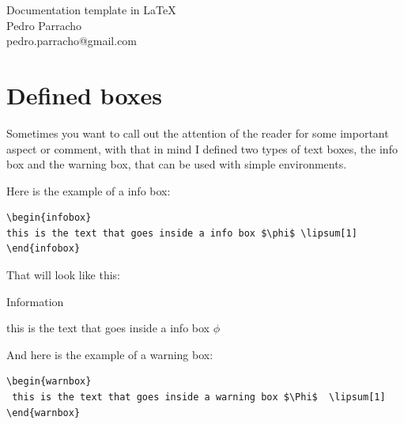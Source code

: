 \documentclass[12pt, a4paper,twoside]{article}
\title{\titleinfo}
\author{\authorinfo \\ \authoremail }
\date{}                                           %
\makeatletter
\def\mymaketitle{
\thispagestyle{plain}
\begin{center}
\vspace*{1.1cm}
\color{title_color}
\fontfamily{phv}\selectfont\LARGE{\titleinfo}\\[0.4cm]
\color{black}
\large{\authorinfo}\\[0.3cm]
\normalsize \authoremail
\end{center}
\vspace*{-0.5cm}
}
\newenvironment{infobox}{%
\bigskip
\renewcommand\logowidth{40pt}
\begin{bclogo}[logo=\bcinfo, couleur = LightSteelBlue1, epBarre = 4, couleurBarre = DeepSkyBlue3,ombre = true, couleurOmbre = Snow3,blur, noborder = true, marge=8, arrondi = 0.4,epOmbre = 0.18]{Information}%
}
{%
\renewcommand\logowidth{17pt}
\end{bclogo}%
}%
\newenvironment{warnbox}{%
\renewcommand\logowidth{40pt}
\bigskip
\begin{bclogo}[logo=\bcattention, couleur = LightPink1, epBarre = 4, couleurBarre = Red1,ombre = true, couleurOmbre = Snow3,blur, noborder = true, marge=8,arrondi = 0.4, epOmbre = 0.15]{Warning}%
}
{%
\renewcommand\logowidth{17pt}
\end{bclogo}%
}%
\newcommand{\titleinfo}{Documentation template in LaTeX}
\newcommand{\authorinfo}{Pedro  Parracho}
\newcommand{\authoremail}{ pedro.parracho@gmail.com}
\makeatother
\begin{document}
\mymaketitle
\thispagestyle{fancy}

\begin{abstract}
This is a template I wrote in order to have something to produce, nice,  small documents to in document stuff, mainly code.\\
With that goal, I went through a bunch of packages, and leave here some settings I liked to use in my documents.
The source of this document can also be useful for you to learn some tricks about how some of these packages.
In this document I use \emph{fullpage} for smaller margins, \emph{xcolor} to define nice colors, \emph{abstract} to change abstract settings, \emph{fancyhdr} for the headers, \emph{sectsty} to redefine section title font, \emph{bclogo} and \emph{pstricks} for nice colorful boxes,  \emph{rotating},  \emph{booktabs} and   \emph{multirow} for tables, \emph{subcaption} for images side-by-side and, \emph{listings} to include code in the document.
\end{abstract}

\section{Defined boxes}
Sometimes you want to call out the attention of the reader for some important aspect or comment, with that in mind I defined two  types of text boxes, the info box and the warning box, that can be used with simple environments. 


Here is the example of a info box: 

\begin{lstlisting}[language={[LaTeX]TeX}]
\begin{infobox} 
this is the text that goes inside a info box $\phi$ \lipsum[1]
\end{infobox}
\end{lstlisting}

That will look like this:

\begin{infobox} 
this is the text that goes inside a info box $\phi$ \lipsum[1]
\end{infobox}


And here is the example of a warning box:
\begin{lstlisting}[language={[LaTeX]TeX}]
\begin{warnbox} 
 this is the text that goes inside a warning box $\Phi$  \lipsum[1]
\end{warnbox}
\end{lstlisting}
\end{document}
